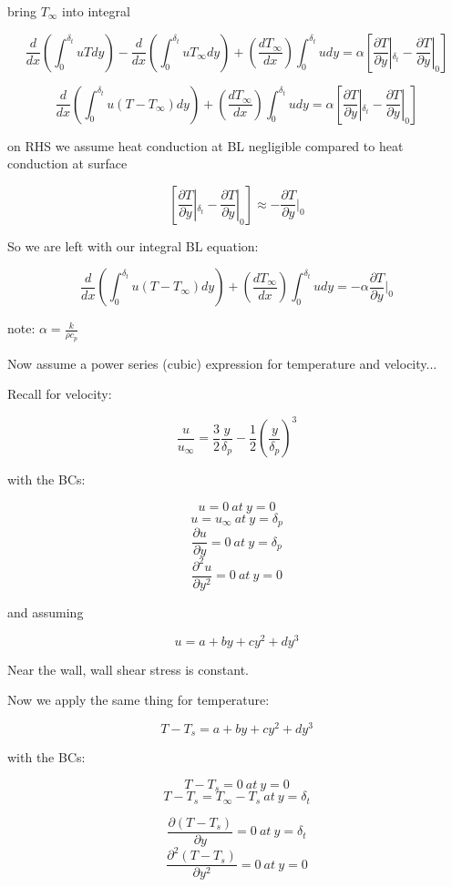 \documentclass[11pt]{article}
\begin{document}
bring $T_\infty$ into integral

$$ \frac{d}{dx} \left( \int_{0}^{\delta_t} uT dy \right)   -\frac{d}{dx} \left( \int_{0}^{\delta_t} u  T_\infty  dy \right) + \left( \frac{d T_\infty }{dx} \right) \int_{0}^{\delta_t} u dy     = \alpha [\frac{\partial T}{\partial y}|_{\delta_t} -  \frac{\partial T}{\partial y} |_0] $$ 

$$ \frac{d}{dx} \left( \int_{0}^{\delta_t} u(T-T_\infty) dy \right)   + \left( \frac{d T_\infty }{dx} \right) \int_{0}^{\delta_t} u dy     = \alpha [\frac{\partial T}{\partial y}|_{\delta_t} -  \frac{\partial T}{\partial y} |_0] $$ 

on RHS we assume heat conduction at BL negligible compared to heat conduction at surface

$$[\frac{\partial T}{\partial y}|_{\delta_t} -  \frac{\partial T}{\partial y} |_0] \approx - \frac{\partial T}{\partial y} |_0$$

So we are left with our integral BL equation:

$$ \frac{d}{dx} \left( \int_{0}^{\delta_t} u(T-T_\infty) dy \right)   + \left( \frac{d T_\infty }{dx} \right) \int_{0}^{\delta_t} u dy = - \alpha \frac{\partial T}{\partial y} |_0 $$ 

note: $\alpha = \frac{k}{\rho c_p}$

Now assume a power series (cubic) expression for temperature and velocity...

Recall for velocity:

\begin{equation}
\frac{u}{u_\infty} = \frac{3}{2} \frac{y}{\delta_p} - \frac{1}{2} (\frac{y}{\delta_p})^3
\end{equation}

with the BCs:

$$u=0 \ at \  y=0$$
$$u=u_\infty \ at \  y=\delta_p$$
$$\frac{\partial u}{\partial y}= 0 \ at \ y=\delta_p$$
$$\frac{\partial ^2 u}{\partial y^2} = 0 \ at \ y=0$$

and assuming

$$u = a + by + cy^2 + dy^3$$

Near the wall, wall shear stress is constant.

Now we apply the same thing for temperature:

$$T-T_s = a + by + cy^2 + dy^3$$

with the BCs:

$$T-T_s = 0  \ at \ y = 0$$
$$T-T_s= T_\infty -T_s \ at \ y = \delta_t$$

$$\frac{\partial (T-T_s)}{\partial y} = 0 \ at \ y=\delta_t$$
$$\frac{\partial^2 (T-T_s)}{\partial y^2} = 0 \ at \ y=0$$
\end{document}
